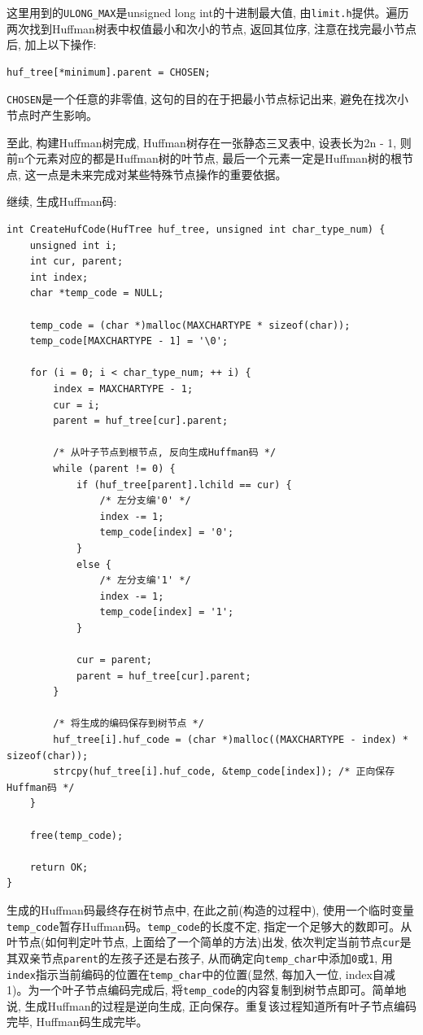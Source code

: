 \documentclass{ctexart}
\begin{document}
这里用到的\texttt{ULONG\_MAX}是unsigned long int的十进制最大值, 由\texttt{limit.h}提供。遍历两次找到Huffman树表中权值最小和次小的节点, 返回其位序, 注意在找完最小节点后, 加上以下操作:

{\setmainfont{Courier New Bold}              
\begin{lstlisting}
huf_tree[*minimum].parent = CHOSEN;
\end{lstlisting}}

\texttt{CHOSEN}是一个任意的非零值, 这句的目的在于把最小节点标记出来, 避免在找次小节点时产生影响。

至此, 构建Huffman树完成, Huffman树存在一张静态三叉表中, 设表长为2n - 1, 则前n个元素对应的都是Huffman树的叶节点, 最后一个元素一定是Huffman树的根节点, 这一点是未来完成对某些特殊节点操作的重要依据。

继续, 生成Huffman码:

{\setmainfont{Courier New Bold}              
\begin{lstlisting}
int CreateHufCode(HufTree huf_tree, unsigned int char_type_num) {
    unsigned int i;
    int cur, parent;
    int index;
    char *temp_code = NULL;

    temp_code = (char *)malloc(MAXCHARTYPE * sizeof(char));
    temp_code[MAXCHARTYPE - 1] = '\0';

    for (i = 0; i < char_type_num; ++ i) {
        index = MAXCHARTYPE - 1;
        cur = i;
        parent = huf_tree[cur].parent;

        /* 从叶子节点到根节点, 反向生成Huffman码 */
        while (parent != 0) {
            if (huf_tree[parent].lchild == cur) {
                /* 左分支编'0' */
                index -= 1;
                temp_code[index] = '0';
            }
            else {
                /* 左分支编'1' */
                index -= 1;
                temp_code[index] = '1';
            }

            cur = parent;
            parent = huf_tree[cur].parent;
        }

        /* 将生成的编码保存到树节点 */
        huf_tree[i].huf_code = (char *)malloc((MAXCHARTYPE - index) * sizeof(char));
        strcpy(huf_tree[i].huf_code, &temp_code[index]); /* 正向保存Huffman码 */
    }

    free(temp_code);

    return OK;
}
\end{lstlisting}}

生成的Huffman码最终存在树节点中, 在此之前(构造的过程中), 使用一个临时变量\texttt{temp\_code}暂存Huffman码。\texttt{temp\_code}的长度不定, 指定一个足够大的数即可。从叶节点(如何判定叶节点,
上面给了一个简单的方法)出发, 依次判定当前节点\texttt{cur}是其双亲节点\texttt{parent}的左孩子还是右孩子, 从而确定向\texttt{temp\_char}中添加\texttt{0}或\texttt{1}, 用\texttt{index}指示当前编码的位置在\texttt{temp\_char}中的位置(显然, 每加入一位, index自减1)。为一个叶子节点编码完成后, 将\texttt{temp\_code}的内容复制到树节点即可。简单地说, 生成Huffman的过程是逆向生成, 正向保存。重复该过程知道所有叶子节点编码完毕, Huffman码生成完毕。
\end{document}
